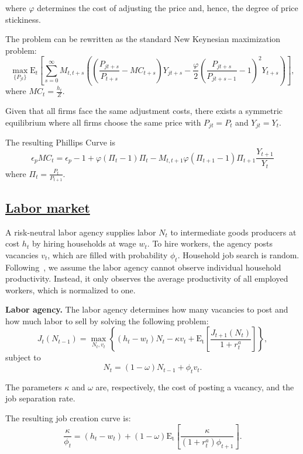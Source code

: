 \documentclass[\latexroot/\projectname]{subfiles}
\begin{document}
where $\varphi$ determines the cost of adjusting the price and, hence, the degree of price stickiness.

The problem can be rewritten as the standard New Keynesian maximization problem:
\[
  \max_{\{P_{jt}\}} \mathrm{E}_{t}\left[\sum_{s=0}^{\infty}  M_{t,t+s} \left( \left( \frac{P_{jt+s}}{P_{t+s}} - MC_{t+s}\right)Y_{jt+s} -  \frac{\varphi}{2}{\left( \frac{P_{jt+s}}{P_{jt+s-1}} - 1\right)}^{2} Y_{t+s} \right)\right],
\]
where $MC_{t} = \frac{h_{t}}{Z}$.

Given that all firms face the same adjustment costs, there exists a symmetric equilibrium where all firms choose the same price with $P_{jt}=P_{t}$ and $Y_{jt}=Y_{t}$.

The resulting Phillips Curve is
\[
  \epsilon_{p} MC_{t} = \epsilon_{p} - 1 + \varphi ( \Pi_{t} -1) \Pi_{t} - M_{t,t+1} \varphi (\Pi_{t+1} -1 ) \Pi_{t+1} \frac{Y_{t+1}}{Y_{t}}
\]
where $\Pi_{t} = \frac{P_{t}}{P_{t+1}}$.

\subsection{\href{https://econ-ark.github.io/HAFiscal/\#sec:hank-labor-market}{Labor market}}\whenintegrated{\label{sec:hank-labor-market}}

A risk-neutral labor agency supplies labor \( N_t \) to intermediate goods producers at cost \( h_t \) by hiring households at wage \( w_t \). To hire workers, the agency posts vacancies \( v_t \), which are filled with probability \( \phi_t \). Household job search is random. Following~\cite{Bardoczy2022}, we assume the labor agency cannot observe individual household productivity. Instead, it only observes the average productivity of all employed workers, which is normalized to one.

\textbf{Labor agency.} The labor agency determines how many vacancies to post and how much labor to sell by solving the following problem:
\[
  J_{t}(N_{t-1})  = \max_{N_{t},v_{t}} \left\{( h_{t} - w_{t}) N_{t}- \kappa v_{t} + \mathrm{E_{t}}\left[ \frac{J_{t+1}(N_{t})}{1 + r^{a}_{t}}\right]\right\},
\]
subject to
\[
  N_{t} = (1-\omega)N_{t-1} + \phi_{t} v_{t}.
\]

The parameters $\kappa$ and $\omega$ are, respectively, the cost of posting a vacancy, and the job separation rate.

The resulting job creation curve is:
\[
  \frac{\kappa}{\phi_{t}}  = (h_{t} - w_{t})+  (1-\omega)\mathrm{E_{t}}\left[   \frac{\kappa}{(1+r^{a}_{t}) \phi_{t+1}} \right].
\]
\end{document}
